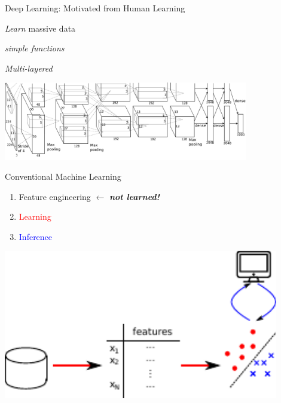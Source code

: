 \documentclass{beamer}
\newcommand{\tred}[1]{\textcolor{red}{#1}}
\newcommand{\tblue}[1]{\textcolor{blue}{#1}}
\begin{document}
\begin{frame}{Deep Learning: Motivated from Human Learning}
     \begin{minipage}{0.32\textwidth}
         \centering
         \small
         \textit{Learn} massive data
     \end{minipage}
     \hfill
     \begin{minipage}{0.32\textwidth}
         \centering
         \small
         \textit{simple functions}
     \end{minipage}
     \hfill
     \begin{minipage}{0.32\textwidth}
         \centering
         \small
         \textit{Multi-layered} 
     \end{minipage}

     \vspace{3mm}
    \centering
    \includegraphics[width=0.8\textwidth]{alex_imagenet}
    \\

    \vfill

\end{frame}

\begin{frame}{Conventional Machine Learning}
    \raggedright
    \begin{enumerate}
        \item Feature engineering $\leftarrow$ {\bf \emph{not learned!}}
        \item \tred{Learning}
        \item \tblue{Inference}
    \end{enumerate}

    \vspace{-24mm}
    \begin{center}
    \includegraphics[width=0.9\textwidth]{pipeline1.pdf}
    \end{center}

\end{frame}
\end{document}
